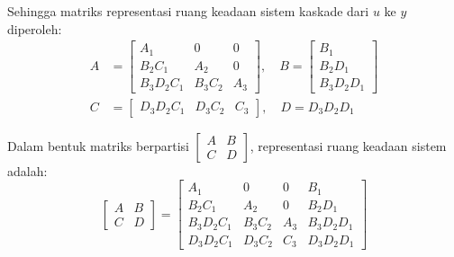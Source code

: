 \documentclass[11pt,a4paper]{article}
\begin{document}
Sehingga matriks representasi ruang keadaan sistem kaskade dari $u$ ke $y$ diperoleh:
\begin{align*}
    A &= \begin{bmatrix}
        A_1 & 0 & 0 \\
        B_2 C_1 & A_2 & 0 \\
        B_3 D_2 C_1 & B_3 C_2 & A_3
    \end{bmatrix}, \quad
    B = \begin{bmatrix}
        B_1 \\
        B_2 D_1 \\
        B_3 D_2 D_1
    \end{bmatrix} \\[6pt]
    C &= \begin{bmatrix}
        D_3 D_2 C_1 & D_3 C_2 & C_3
    \end{bmatrix}, \quad
    D = D_3 D_2 D_1
\end{align*}

Dalam bentuk matriks berpartisi $\left[ \begin{array}{c|c} A & B \\ \hline C & D \end{array} \right]$, representasi ruang keadaan sistem adalah:
\begin{equation*}
    \left[
    \begin{array}{c|c}
        A & B \\
        \hline
        C & D
    \end{array}
    \right]
    =
    \left[
    \begin{array}{ccc|c}
        A_1 & 0 & 0 & B_1 \\
        B_2 C_1 & A_2 & 0 & B_2 D_1 \\
        B_3 D_2 C_1 & B_3 C_2 & A_3 & B_3 D_2 D_1 \\
        \hline
        D_3 D_2 C_1 & D_3 C_2 & C_3 & D_3 D_2 D_1
    \end{array}
    \right]
\end{equation*}
\end{document}
